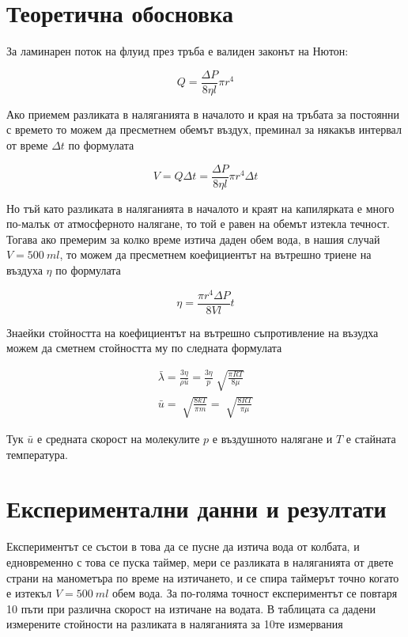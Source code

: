 \documentclass[%
 reprint,
 amsmath,amssymb,
 aps,
]{revtex4-2}
\begin{document}
\section{Теоретична обосновка}

За ламинарен поток на флуид през тръба е валиден законът на Нютон: 

\begin{equation*}
    Q = \frac{\Delta P}{8\eta l}\pi r^4
\end{equation*}

Ако приемем разликата в наляганията в началото и края на тръбата за постоянни с времето то можем да пресметнем обемът въздух, преминал за някакъв интервал от време $\Delta t$ по формулата

\begin{equation*}
    V = Q\Delta t = \frac{\Delta P}{8\eta l}\pi r^4 \Delta t
\end{equation*}

Но тъй като разликата в наляганията в началото и краят на капилярката е много по-малък от атмосферното налягане, то той е равен на обемът изтекла течност. Тогава ако премерим за колко време изтича даден обем вода, в нашия случай $V = 500 \ \si{ml}$, то можем да пресметнем коефициентът на вътрешно триене на въздуха $\eta$ по формулата 

\begin{equation*}
    \eta = \frac{\pi r^4 \Delta P}{8Vl}t \label{eq:1} \tag{1}
\end{equation*}

Знаейки стойността на коефициентът на вътрешно съпротивление на възудха можем да сметнем стойността му по следната формулата

\begin{gather*}
    \bar{\lambda} = \frac{3\eta}{\rho \bar{u}} = \frac{3\eta}{p} \sqrt[]{\frac{\pi RT}{8\mu}} \label{eq:2} \tag{2} \\ 
    \bar{u} = \sqrt[]{\frac{8kT}{\pi m}} = \sqrt[]{\frac{8RT}{\pi \mu}} 
\end{gather*}

Тук $\bar{u}$ е средната скорост на молекулите $p$ е въздушното налягане и $T$ е стайната температура. 

\section{Експериментални данни и резултати}

Експериментът се състои в това да се пусне да изтича вода от колбата, и едновременно с това се пуска таймер, мери се разликата в наляганията от двете страни на манометъра по време на изтичането, и се спира таймерът точно когато е изтекъл $V = 500 \ \si{ml}$ обем вода. За по-голяма точност експериментът се повтаря 10 пъти при различна скорост на изтичане на водата. В таблицата са дадени измерените стойности на разликата в наляганията за 10те измервания
\end{document}
